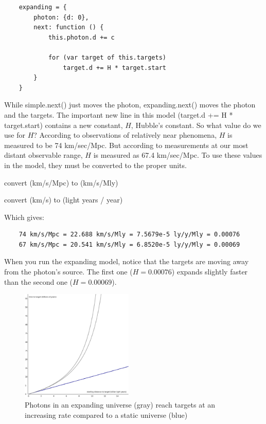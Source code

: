 \documentclass{ws-mpla}
\begin{document}
\begin{verbatim}
    expanding = {
        photon: {d: 0},
        next: function () {
            this.photon.d += c
    
            for (var target of this.targets)
                target.d += H * target.start
        }
    }
\end{verbatim}

While simple.next() just moves the photon, expanding.next() moves the photon and the targets. The important new line in this model 
(target.d  += H * target.start) contains a new constant, $H$, Hubble's constant. 
So what value do we use for $H$? According to observations of relatively near phenomena, $H$ is measured to be 74 km/sec/Mpc.\cite{Riess} 
But according to measurements at our most distant observable range, $H$ is measured as 67.4 km/sec/Mpc.\cite{Planck}
To use these values in the model, they must be converted to the proper units.

\begin{romanlist}
 \item convert (km/s/Mpc) to (km/s/Mly) 
 \item convert (km/s) to (light years / year) 
\end{romanlist}

Which gives: 

\begin{verbatim}
    74 km/s/Mpc = 22.688 km/s/Mly = 7.5679e-5 ly/y/Mly = 0.00076
    67 km/s/Mpc = 20.541 km/s/Mly = 6.8520e-5 ly/y/Mly = 0.00069
\end{verbatim}

When you run the expanding model, notice that the targets are moving away from the photon's source. The first one ($H=0.00076$) 
expands slightly faster than the second one ($H=0.00069$). 

\begin{figure}[h]
\centerline{\includegraphics[width=2.1in]{graph_white_expanding.eps}}
\vspace*{8pt}
\caption{Photons in an expanding universe (gray) reach targets at an increasing rate compared to a static universe (blue)}
\label{fig:expanding}
\end{figure}
\end{document}

